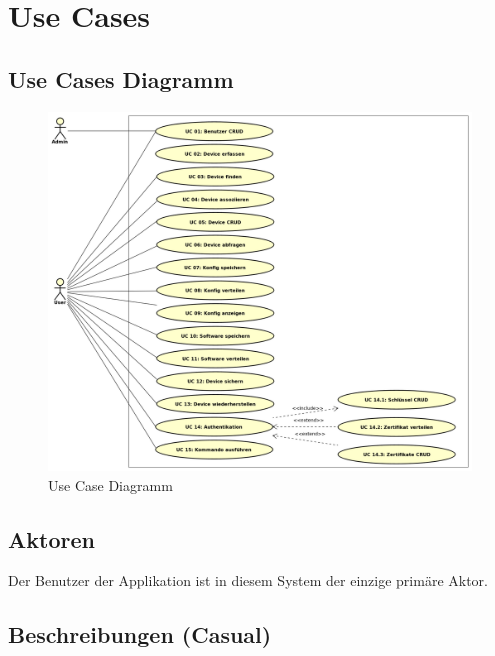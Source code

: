 \section{Use Cases}
\subsection{Use Cases Diagramm}
\begin{figure}[H]
\centering
\includegraphics[scale=0.425]{images/use_case_diagram.png}\caption{Use Case Diagramm}
\end{figure}
\subsection{Aktoren}
Der Benutzer der Applikation ist in diesem System der einzige primäre Aktor.
\newpage
\subsection{Beschreibungen (Casual)}
